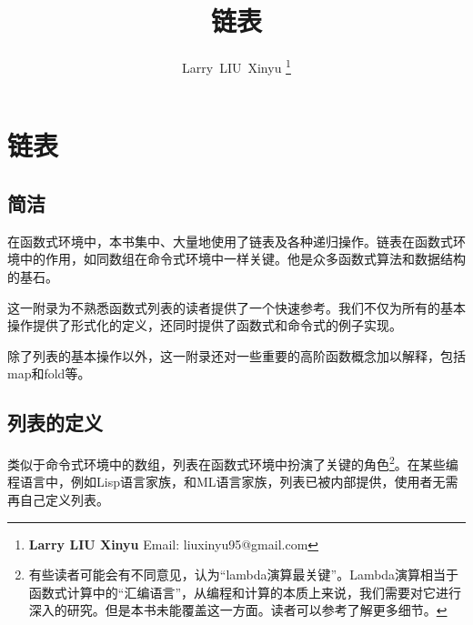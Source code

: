 \documentclass[UTF8]{article}
\begin{document}


\title{链表}

\author{Larry~LIU~Xinyu
\thanks{{\bfseries Larry LIU Xinyu } \newline
  Email: liuxinyu95@gmail.com \newline}
  }

\maketitle
\fi


\ifx\wholebook\relax
\chapter{链表}
\fi

\section{简洁}
\label{introduction}

在函数式环境中，本书集中、大量地使用了链表及各种递归操作。链表在函数式环境中的作用，如同数组在命令式环境中一样关键。他是众多函数式算法和数据结构的基石。

这一附录为不熟悉函数式列表的读者提供了一个快速参考。我们不仅为所有的基本操作提供了形式化的定义，还同时提供了函数式和命令式的例子实现。

除了列表的基本操作以外，这一附录还对一些重要的高阶函数概念加以解释，包括map和fold等。


\section{列表的定义}

类似于命令式环境中的数组，列表在函数式环境中扮演了关键的角色\footnote{有些读者可能会有不同意见，认为“lambda演算最关键”。Lambda演算相当于函数式计算中的“汇编语言”，从编程和计算的本质上来说，我们需要对它进行深入的研究。但是本书未能覆盖这一方面。读者可以参考\cite{mittype}了解更多细节。}。在某些编程语言中，例如Lisp语言家族，和ML语言家族，列表已被内部提供，使用者无需再自己定义列表。
\end{document}
